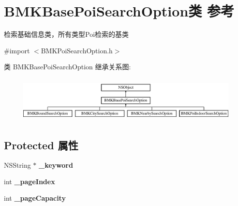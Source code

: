\hypertarget{interface_b_m_k_base_poi_search_option}{}\section{B\+M\+K\+Base\+Poi\+Search\+Option类 参考}
\label{interface_b_m_k_base_poi_search_option}


检索基础信息类，所有类型\+Poi检索的基类  




{\ttfamily \#import $<$B\+M\+K\+Poi\+Search\+Option.\+h$>$}

类 B\+M\+K\+Base\+Poi\+Search\+Option 继承关系图\+:\begin{figure}[H]
\begin{center}
\leavevmode
\includegraphics[height=2.346369cm]{interface_b_m_k_base_poi_search_option}
\end{center}
\end{figure}
\subsection*{Protected 属性}
\begin{DoxyCompactItemize}
\item 
\hypertarget{interface_b_m_k_base_poi_search_option_aec623956bb8cfc11c5d5959c6cf698da}{}N\+S\+String $\ast$ {\bfseries \+\_\+keyword}\label{interface_b_m_k_base_poi_search_option_aec623956bb8cfc11c5d5959c6cf698da}

\item 
\hypertarget{interface_b_m_k_base_poi_search_option_a9d3de22e269b9f69806e8f0b077d039f}{}int {\bfseries \+\_\+page\+Index}\label{interface_b_m_k_base_poi_search_option_a9d3de22e269b9f69806e8f0b077d039f}

\item 
\hypertarget{interface_b_m_k_base_poi_search_option_aa2e8a12a6101e57ec5e384f1cef92429}{}int {\bfseries \+\_\+page\+Capacity}\label{interface_b_m_k_base_poi_search_option_aa2e8a12a6101e57ec5e384f1cef92429}

\end{DoxyCompactItemize}
